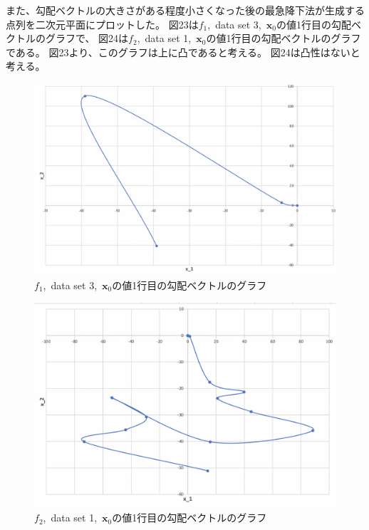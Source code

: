 \documentclass[12pt]{jarticle}
\begin{document}
\clearpage

また、勾配ベクトルの大きさがある程度小さくなった後の最急降下法が生成する点列を二次元平面にプロットした。
図23は$f_1$,\ data set 3,\ $\boldsymbol{x}_0$の値1行目の勾配ベクトルのグラフで、
図24は$f_2$,\ data set 1,\ $\boldsymbol{x}_0$の値1行目の勾配ベクトルのグラフである。
図23より、このグラフは上に凸であると考える。
図24は凸性はないと考える。


\begin{figure}[h]
    \begin{center}
        \includegraphics[scale=0.2]{kadai1_graph3.png}
    \end{center}
    \caption{$f_1$,\ data set 3,\ $\boldsymbol{x}_0$の値1行目の勾配ベクトルのグラフ}
\end{figure}

\begin{figure}[h]
    \begin{center}
        \includegraphics[scale=0.2]{kadai1_graph4.png}
    \end{center}
    \caption{$f_2$,\ data set 1,\ $\boldsymbol{x}_0$の値1行目の勾配ベクトルのグラフ}
\end{figure}
\end{document}
